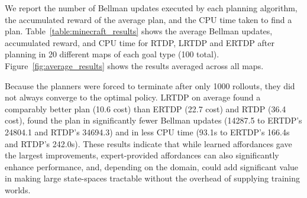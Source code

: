 \documentclass[letterpaper]{article}
\begin{document}
We report the number of Bellman updates executed by each planning
algorithm, the accumulated reward of the average plan, and the CPU
time taken to find a plan. Table~\ref{table:minecraft_results} shows
the average Bellman updates, accumulated reward, and CPU time for
RTDP, LRTDP and ERTDP after planning in 20 different maps of each goal
type (100 total). Figure~\ref{fig:average_results} shows the results
averaged across all maps.

Because the planners were forced to terminate after only 1000
rollouts, they did not always converge to the optimal policy. LRTDP on
average found a comparably better plan (10.6 cost) than ERTDP (22.7
cost) and RTDP (36.4 cost), found the plan in significantly fewer
Bellman updates (14287.5 to ERTDP's 24804.1 and RTDP's 34694.3) and in
less CPU time (93.1s to ERTDP's 166.4s and RTDP's 242.0s).  These
results indicate that while learned affordances gave the largest
improvements, expert-provided affordances can also significantly
enhance performance, and, depending on the domain, could add
significant value in making large state-spaces tractable without the
overhead of supplying training worlds.
\end{document}

